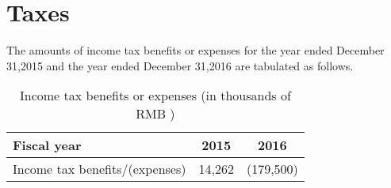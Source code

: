 

\section{Taxes}

The amounts of income tax benefits or expenses for the year ended December 31,2015 and the year ended December 31,2016 are tabulated as follows.


\begin{table}	
	\begin{center}
		\begin{tabular}{lcc}
			\toprule
			\textbf{Fiscal year}&\textbf{2015}&\textbf{2016}\\
			\midrule
			Income tax benefits/(expenses)&14,262&(179,500)\\
			\bottomrule
		\end{tabular}
	\end{center}
	\caption{Income tax benefits or expenses (in thousands of RMB \textyen)}\label{table:1}
\end{table}


